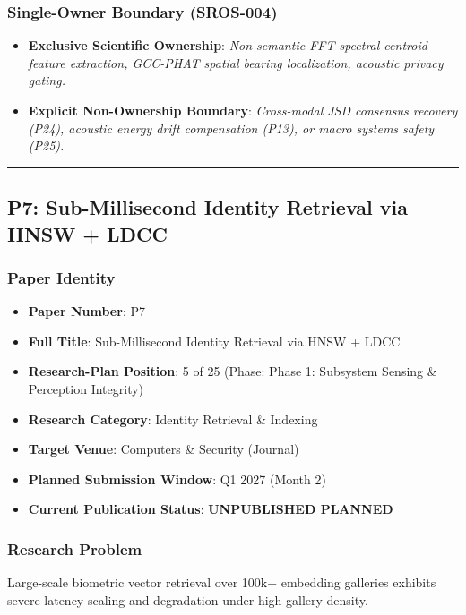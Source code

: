 \documentclass[11pt,letterpaper]{article}
\begin{document}
\subsubsection{Single-Owner Boundary (SROS-004)}
\begin{itemize}[leftmargin=*]
    \item \textbf{Exclusive Scientific Ownership}: \textit{Non-\allowbreak semantic FFT spectral centroid feature extraction, GCC-\allowbreak PHAT spatial bearing localization, acoustic privacy gating.}
    \item \textbf{Explicit Non-Ownership Boundary}: \textit{Cross-\allowbreak modal JSD consensus recovery (P24), acoustic energy drift compensation (P13), or macro systems safety (P25).}
\end{itemize}

\vspace{0.4cm}
\hrule

\subsection{P7: Sub-\allowbreak Millisecond Identity Retrieval via HNSW + LDCC}
\label{sec:profile_p7}

\subsubsection{Paper Identity}
\begin{itemize}[leftmargin=*]
    \item \textbf{Paper Number}: P7
    \item \textbf{Full Title}: Sub-\allowbreak Millisecond Identity Retrieval via HNSW + LDCC
    \item \textbf{Research-Plan Position}: 5 of 25 (Phase: Phase 1: Subsystem Sensing \& Perception Integrity)
    \item \textbf{Research Category}: Identity Retrieval \& Indexing
    \item \textbf{Target Venue}: Computers \& Security (Journal)
    \item \textbf{Planned Submission Window}: Q1 2027 (Month 2)
    \item \textbf{Current Publication Status}: \textbf{UNPUBLISHED PLANNED}
\end{itemize}

\subsubsection{Research Problem}
Large-\allowbreak scale biometric vector retrieval over 100k+ embedding galleries exhibits severe latency scaling and degradation under high gallery density.
\end{document}

